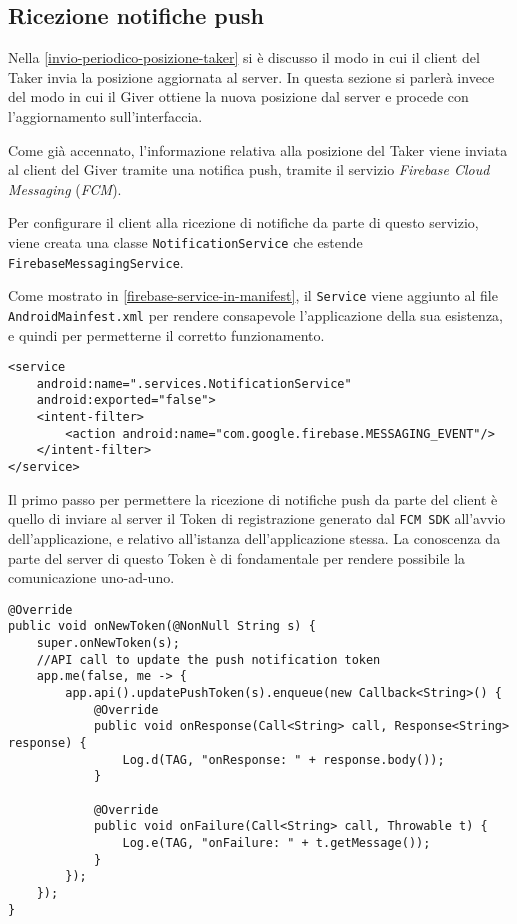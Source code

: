 \subsection{Ricezione notifiche push}
Nella \autoref{invio-periodico-posizione-taker} si è discusso il modo in cui il client del Taker invia la posizione aggiornata al server. In questa sezione si parlerà invece del modo in cui il Giver ottiene la nuova posizione dal server e procede con l'aggiornamento sull'interfaccia. 

Come già accennato, l'informazione relativa alla posizione del Taker viene inviata al client del Giver tramite una notifica push, tramite il servizio \emph{Firebase Cloud Messaging} (\emph{FCM}).

Per configurare il client alla ricezione di notifiche da parte di questo servizio, viene creata una classe \texttt{NotificationService} che estende \texttt{FirebaseMessagingService}.

Come mostrato in \autoref{firebase-service-in-manifest}, il \texttt{Service} viene aggiunto al file \texttt{AndroidMainfest.xml} per rendere consapevole l'applicazione della sua esistenza, e quindi per permetterne il corretto funzionamento.

\begin{lstlisting}[caption=Aggiunta del \texttt{Service} all'interno del file \texttt{AndroidMainfest.xml}, label=firebase-service-in-manifest]
<service
    android:name=".services.NotificationService"
    android:exported="false">
    <intent-filter>
        <action android:name="com.google.firebase.MESSAGING_EVENT"/>
    </intent-filter>
</service>
\end{lstlisting}

Il primo passo per permettere la ricezione di notifiche push da parte
del client è quello di inviare al server il Token di registrazione generato dal \texttt{FCM SDK} all'avvio dell'applicazione, e relativo all'istanza dell'applicazione stessa. La conoscenza da parte del server di questo Token è di fondamentale per rendere possibile la comunicazione uno-ad-uno.

\begin{lstlisting}[caption=Invio del Token al server, label=invio-token]
@Override
public void onNewToken(@NonNull String s) {
    super.onNewToken(s);
    //API call to update the push notification token
    app.me(false, me -> {
        app.api().updatePushToken(s).enqueue(new Callback<String>() {
            @Override
            public void onResponse(Call<String> call, Response<String> response) {
                Log.d(TAG, "onResponse: " + response.body());
            }

            @Override
            public void onFailure(Call<String> call, Throwable t) {
                Log.e(TAG, "onFailure: " + t.getMessage());
            }
        });
    });
}
\end{lstlisting}

